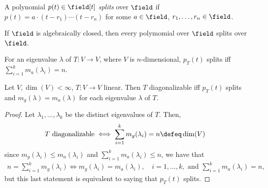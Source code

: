 \begin{definition}[Splits]
    A polynomial $p(t) \in \field[t]$ \emph{splits} over $\field$ if $p(t) = a \cdot (t - r_1) \cdots (t - r_n)$ for some $a \in \field$, $r_1, \dots, r_n \in \field$.
\end{definition}

\begin{remark}
    If $\field$ is algebraically closed, then every polymomial over $\field$ splits over $\field$.
\end{remark}

\begin{remark}
    For an eigenvalue $\lambda$ of $T : V \to V$, where $V$ is $n$-dimensional, $p_T(t)$ splits iff $\sum_{i=1}^k m_a(\lambda_i) = n$.
\end{remark}

\begin{theorem}
    Let $V, \dim(V) < \infty$, $T : V \to V$ linear. Then $T$ diagonalizable iff $p_T(t)$ splits and $m_g(\lambda) = m_a(\lambda)$ for each eigenvalue $\lambda$ of $T$.
\end{theorem}

\begin{proof}
    Let $\lambda_1, \dots, \lambda_k$ be the distinct eigenvalues of $T$. Then, \begin{align*}
        T \text{ diagonalizable} &\iff \sum_{i=1}^k m_g(\lambda_i) = n \defeq \dim(V)
    \end{align*}
    since $m_g(\lambda_i) \leq m_a(\lambda_i)$ and $\sum_{i=1}^k m_a(\lambda_i) \leq n$, we have that \begin{align*}
        n = \sum_{i=1}^k m_g(\lambda_i) \iff m_g(\lambda_i) = m_a(\lambda_i), \quad i = 1, \dots, k, \text{ and } \sum_{i=1}^k m_{a}(\lambda_i) = n,
    \end{align*}
    but this last statement is equivalent to saying that $p_T(t)$ splits.
\end{proof}